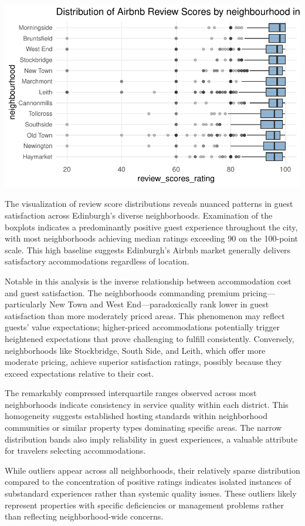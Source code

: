 \documentclass[
]{article}
\begin{document}
\includegraphics[width=0.8\linewidth]{hw-02-airbnb-edi_files/figure-latex/unnamed-chunk-10-1}

The visualization of review score distributions reveals nuanced patterns
in guest satisfaction across Edinburgh's diverse neighborhoods.
Examination of the boxplots indicates a predominantly positive guest
experience throughout the city, with most neighborhoods achieving median
ratings exceeding 90 on the 100-point scale. This high baseline suggests
Edinburgh's Airbnb market generally delivers satisfactory accommodations
regardless of location.

Notable in this analysis is the inverse relationship between
accommodation cost and guest satisfaction. The neighborhoods commanding
premium pricing---particularly New Town and West End---paradoxically
rank lower in guest satisfaction than more moderately priced areas. This
phenomenon may reflect guests' value expectations; higher-priced
accommodations potentially trigger heightened expectations that prove
challenging to fulfill consistently. Conversely, neighborhoods like
Stockbridge, South Side, and Leith, which offer more moderate pricing,
achieve superior satisfaction ratings, possibly because they exceed
expectations relative to their cost.

The remarkably compressed interquartile ranges observed across most
neighborhoods indicate consistency in service quality within each
district. This homogeneity suggests established hosting standards within
neighborhood communities or similar property types dominating specific
areas. The narrow distribution bands also imply reliability in guest
experiences, a valuable attribute for travelers selecting
accommodations.

While outliers appear across all neighborhoods, their relatively sparse
distribution compared to the concentration of positive ratings indicates
isolated instances of substandard experiences rather than systemic
quality issues. These outliers likely represent properties with specific
deficiencies or management problems rather than reflecting
neighborhood-wide concerns.
\end{document}
